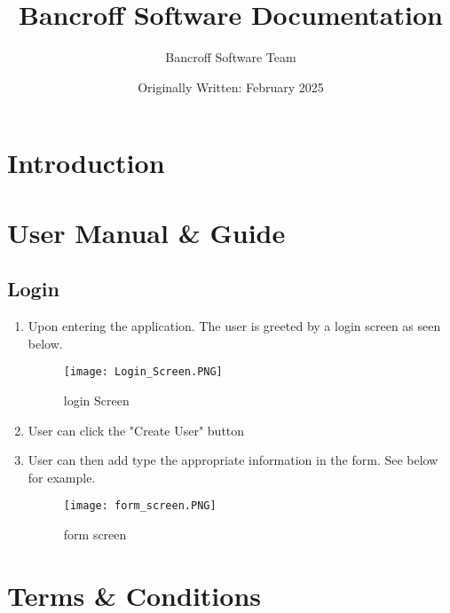 \documentclass{article}
\title{Bancroff Software Documentation}
\author{Bancroff Software Team}
\date{Originally Written: February 2025}
\begin{document}
\maketitle

\section{Introduction}

\section{User Manual \& Guide}
    \subsection{Login}
        \begin{enumerate}
            \item Upon entering the application. The user is greeted by a login screen as seen below.
                \begin{figure}[h]
                \centering
                \texttt{[image: Login\_Screen.PNG]}
                \caption{login Screen}
                \end{figure}
            \item User can click the "Create User" button
            \item User can then add type the appropriate information in the form. See below for example.
                \begin{figure}[h]
                \centering
                \texttt{[image: form\_screen.PNG]}
                \caption{form screen}
                \end{figure}
        \end{enumerate}
    \section{Terms \& Conditions}
\end{document}
